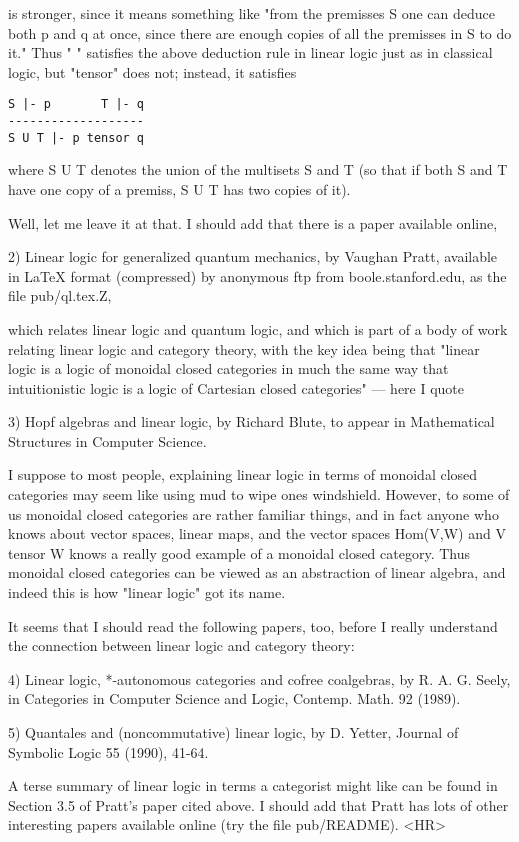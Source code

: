 is stronger, since it means something like "from the premisses S one can
deduce both p and q at once, since there are enough copies of all the
premisses in S to do it."  Thus "\text{\&} " satisfies the above deduction rule
in linear logic just as in classical logic, but "tensor" does not;
instead, it satisfies

\begin{verbatim}
S |- p       T |- q
-------------------
S U T |- p tensor q
\end{verbatim}
    

where S U T denotes the union of the multisets S and T (so that if both
S and T have one copy of a premiss, S U T has two copies of it).  

Well, let me leave it at that.  I should add that there is a paper
available online,

2) Linear logic for generalized quantum mechanics, by Vaughan Pratt, 
available in LaTeX format (compressed) by anonymous ftp from
boole.stanford.edu, as the file pub/ql.tex.Z,

which relates linear logic and quantum logic, and which is part of a body
of work relating linear logic and category theory, with the key idea
being that "linear logic is a logic of monoidal closed categories in
much the same way that intuitionistic logic is a logic of Cartesian
closed categories" --- here I quote

3) Hopf algebras and linear logic, by Richard Blute, to appear in
Mathematical Structures in Computer Science.  

I suppose to most people, explaining linear logic in terms of monoidal
closed categories may seem like using mud to wipe ones windshield.
However, to some of us monoidal closed categories are rather familiar
things, and in fact anyone who knows about vector spaces, linear maps, 
and the vector spaces Hom(V,W) and V tensor W knows a really good
example of a monoidal closed category.  Thus monoidal closed categories
can be viewed as an abstraction of linear algebra, and indeed this is
how "linear logic" got its name.  

It seems that I should read the following papers, too, before I really
understand the connection between linear logic and category theory:

4) Linear logic, *-autonomous categories and cofree coalgebras, by R. A. G.
Seely, in Categories in Computer Science and Logic, Contemp. Math.
92 (1989).  

5) Quantales and (noncommutative) linear logic, by D. Yetter, Journal of
Symbolic Logic 55 (1990), 41-64.

A terse summary of linear logic in terms a categorist might like can be
found in Section 3.5 of Pratt's paper cited above.  I should add that 
Pratt has lots of other interesting papers available online (try the
file pub/README).  
<HR>



